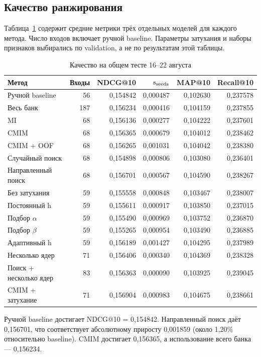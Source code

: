\documentclass[12pt,a4paper]{article}
\begin{document}
\subsection{Качество ранжирования}
Таблица~\ref{tab:quality} содержит средние метрики трёх отдельных моделей
для каждого метода. Число входов включает ручной baseline.
Параметры затухания и наборы признаков выбирались по validation,
а не по результатам этой таблицы.
\begin{table}[H]
\centering
\small
\caption{Качество на общем тесте 16–22 августа}\label{tab:quality}
\begin{tabular}{lrrrrr}\toprule
Метод & Входы & NDCG@10 & $s_{\rm seeds}$ & MAP@10 & Recall@10 \\ \midrule
Ручной baseline & 56 & 0,154842 & 0,000487 & 0,102630 & 0,237578 \\
Весь банк & 187 & 0,156234 & 0,000416 & 0,104159 & 0,237855 \\
MI & 68 & 0,156136 & 0,000277 & 0,104222 & 0,237601 \\
CMIM & 68 & 0,156365 & 0,000679 & 0,104012 & 0,238462 \\
CMIM + OOF & 68 & 0,156265 & 0,001031 & 0,104042 & 0,238380 \\
Случайный поиск & 68 & 0,154898 & 0,000806 & 0,103080 & 0,236401 \\
Направленный поиск & 68 & 0,156701 & 0,000567 & 0,104590 & 0,238267 \\
Без затухания & 59 & 0,155558 & 0,000848 & 0,103467 & 0,238007 \\
Постоянный h & 59 & 0,155611 & 0,000917 & 0,103850 & 0,237015 \\
Подбор $\alpha$ & 59 & 0,155490 & 0,000969 & 0,103752 & 0,236870 \\
Подбор $\beta$ & 59 & 0,155265 & 0,000954 & 0,103490 & 0,236885 \\
Адаптивный h & 59 & 0,156189 & 0,001427 & 0,104295 & 0,237989 \\
Несколько ядер & 71 & 0,156406 & 0,000340 & 0,104369 & 0,238328 \\
Поиск + несколько ядер & 83 & 0,156363 & 0,000090 & 0,103925 & 0,239045 \\
CMIM + затухание & 71 & 0,156904 & 0,000983 & 0,104675 & 0,238661 \\
\bottomrule
\end{tabular}
\end{table}
Ручной baseline достигает NDCG@10 = 0,154842. Направленный поиск
даёт 0,156701, что соответствует абсолютному приросту 0,001859
(около 1,20\% относительно baseline). CMIM достигает 0,156365,
а использование всего банка — 0,156234.
\end{document}
